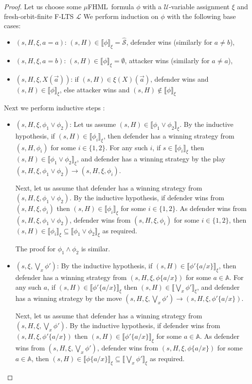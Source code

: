 \documentclass[10pt,a4paper]{article}
\theoremstyle{definition}
\theoremstyle{remark}
\newcommand\fhml[0]{$\mu$FHML}
\newcommand\sem[2][\xi]{\llbracket#2\rrbracket_{#1}}
\newcommand\Lcal{\mathcal{L}}
\newcommand\Scal{\mathcal{S}}
\newcommand\Ucal{\mathcal{U}}
\newcommand\Atoms{\mathbb{A}}
\newcommand\fstates[0]{\hat{\Scal}}
\begin{document}
\begin{proof}
	Let us choose some \fhml\ formula $\phi$ with a $\Ucal$-variable assignment $\xi$ and fresh-orbit-finite F-LTS $\Lcal$
	We perform 
	induction on $\phi$ with the following base cases:
	\begin{itemize}
		\item $(s, H, \xi, a = a)$: $(s, H)\in\sem{\phi} = \fstates$, defender wins (similarly for $a \neq b$),
		\item $(s, H, \xi, a = b)$: $(s, H)\in\sem{\phi} = \emptyset$, attacker wins (similarly for $a \neq a$),
		\item $(s, H, \xi, X(\vec a))$: if $(s, H)\in \xi(X)(\vec a)$, defender wins and $(s, H) \in \sem{\phi}$, else attacker wins and $(s, H)\notin \sem{\phi}$
	\end{itemize}
	Next we perform inductive steps :
	\begin{itemize}
		\item $(s, H, \xi, \phi_1 \lor \phi_2)$:
		Let us assume $(s, H) \in \sem{\phi_1 \lor \phi_2}$.
		By the inductive hypothesis, if $(s, H) \in \sem{\phi_i}$, then defender has a winning strategy from $(s, H, \phi_i)$ for some $i \in \{1, 2\}$. 
		For any such $i$, if $s \in \sem{\phi_i}$ then $(s, H)\in \sem{\phi_1 \lor \phi_2}$, and defender has a winning strategy by the play $
		(s, H, \xi, \phi_1 \lor \phi_2) \rightarrow (s, H, \xi, \phi_i)$.
		
		Next, let us assume that defender has a winning strategy from $(s, H, \xi, \phi_1 \lor \phi_2)$. 
		By the inductive hypothesis, if defender wins from $(s, H, \xi, \phi_i)$ then $(s, H)\in \sem{\phi_i}$ for some $i \in \{1, 2\}$.
		As defender wins from $(s, H, \xi, \phi_1 \lor \phi_2)$, defender wins from $(s, H, \xi, \phi_i)$ for some $i \in \{1, 2\}$, then $(s, H) \in \sem{\phi_i} \subseteq \sem{\phi_1 \lor \phi_2}$ as required.
		
		The proof for $\phi_1 \land \phi_2$ is similar.
				\item $(s, \xi, \bigvee_x \phi')$: 
		By the inductive hypothesis, if $(s, H)\in \sem{\phi'\{a/x\}}$, then defender has a winning strategy from $(s, H, \xi, \phi\{a/x\})$ for some $a \in \Atoms$.
		For any such $a$, if $(s, H)\in \sem{\phi'\{a/x\}}$ then $(s, H) \in \sem{\bigvee_x \phi'}$, and defender has a winning strategy by the move $(s, H, \xi, \bigvee_x \phi') \rightarrow (s, H, \xi, \phi'\{a/x\})$.
		
		Next, let us assume that defender has a winning strategy from $(s, H, \xi, \bigvee_x \phi')$. 
		By the inductive hypothesis, if defender wins from $(s, H, \xi, \phi'\{a/x\})$ then $(s, H) \in \sem{\phi'\{a/x\}}$ for some $a \in \Atoms$.
		As defender wins from $(s, H, \xi, \bigvee_x \phi')$, defender wins from $(s, H, \xi, \phi\{a/x\})$ for some $a \in \Atoms$, then $(s, H) \in \sem{\phi\{a/x\}} \subseteq \sem{\bigvee_x \phi'}$ as required.
		

\end{itemize}
\end{proof}
\end{document}
